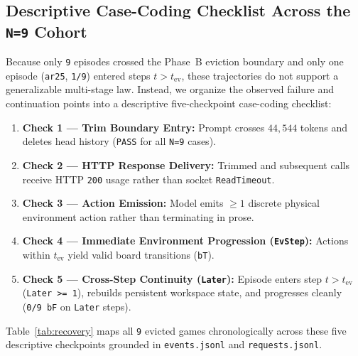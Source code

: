 \documentclass[10pt]{article}
\newcommand{\code}[1]{\texttt{#1}}
\begin{document}
\subsection{Descriptive Case-Coding Checklist Across the \code{N=9} Cohort}
Because only \code{9} episodes crossed the Phase~B eviction boundary and only one episode (\code{ar25}, \code{1/9}) entered steps $t > t_{\text{ev}}$, these trajectories do not support a generalizable multi-stage law. Instead, we organize the observed failure and continuation points into a descriptive five-checkpoint case-coding checklist:
\begin{enumerate}[leftmargin=1.4em,itemsep=1pt]
\item \textbf{Check 1 --- Trim Boundary Entry:} Prompt crosses $44,544$ tokens and deletes head history (\code{PASS} for all \code{N=9} cases).
\item \textbf{Check 2 --- HTTP Response Delivery:} Trimmed and subsequent calls receive HTTP \code{200} usage rather than socket \code{ReadTimeout}.
\item \textbf{Check 3 --- Action Emission:} Model emits $\ge 1$ discrete physical environment action rather than terminating in prose.
\item \textbf{Check 4 --- Immediate Environment Progression (\code{EvStep}):} Actions within $t_{\text{ev}}$ yield valid board transitions (\code{bT}).
\item \textbf{Check 5 --- Cross-Step Continuity (\code{Later}):} Episode enters step $t > t_{\text{ev}}$ (\code{Later >= 1}), rebuilds persistent workspace state, and progresses cleanly (\code{0/9 bF} on \code{Later} steps).
\end{enumerate}

Table~\ref{tab:recovery} maps all \code{9} evicted games chronologically across these five descriptive checkpoints grounded in \code{events.jsonl} and \code{requests.jsonl}.
\end{document}
